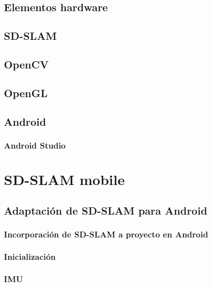 \documentclass[a4paper, 12pt]{book}
\begin{document}
\section{Elementos hardware}
\label{sec:elementoshardware}

\section{SD-SLAM}
\label{sec:sdslam}

\section{OpenCV}
\label{sec:opencv}

\section{OpenGL}
\label{sec:opengl}

\section{Android}
\label{sec:android}

\subsection{Android Studio}
\label{subsec:androidstudio}

\chapter{SD-SLAM mobile}
\label{sec:desarrollo}

\section{Adaptación de SD-SLAM para Android}
\label{sec:adaptacionsdslam}

\subsection{Incorporación de SD-SLAM a proyecto en Android}
\label{subsec:incorporacionsdslam}

\subsection{Inicialización}
\label{subsec:inicializacion}

\subsection{IMU}
\label{subsec:imu}
\end{document}
